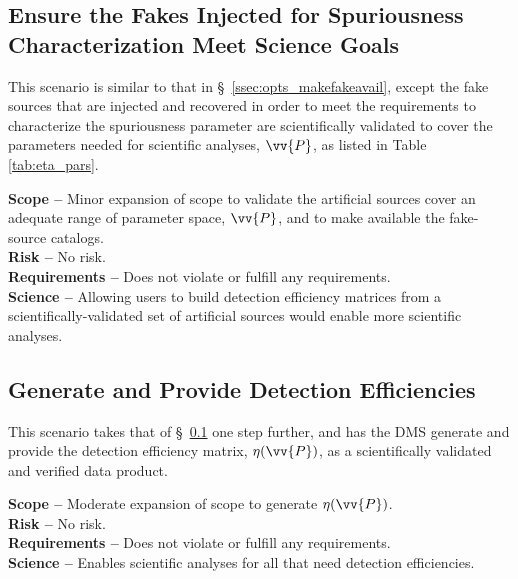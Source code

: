 \documentclass[DM,lsstdraft,toc]{lsstdoc}
\begin{document}
\subsection{Ensure the Fakes Injected for Spuriousness Characterization Meet Science Goals}\label{ssec:opts_ensurefakeP}

This scenario is similar to that in \S~\ref{ssec:opts_makefakeavail}, except the fake sources that are injected and recovered in order to meet the requirements to characterize the spuriousness parameter are scientifically validated to cover the parameters needed for scientific analyses, $\vv{P}$, as listed in Table \ref{tab:eta_pars}.

{\bf Scope --} Minor expansion of scope to validate the artificial sources cover an adequate range of parameter space, $\vv{P}$, and to make available the fake-source catalogs. \\
{\bf Risk --} No risk. \\
{\bf Requirements --} Does not violate or fulfill any requirements. \\
{\bf Science --} Allowing users to build detection efficiency matrices from a scientifically-validated set of artificial sources would enable more scientific analyses.

\subsection{Generate and Provide Detection Efficiencies}\label{ssec:opts_deteffs}

This scenario takes that of \S~\ref{ssec:opts_ensurefakeP} one step further, and has the DMS generate and provide the detection efficiency matrix, $\eta(\vv{P})$, as a scientifically validated and verified data product.

{\bf Scope --} Moderate expansion of scope to generate $\eta(\vv{P})$. \\
{\bf Risk --} No risk. \\
{\bf Requirements --} Does not violate or fulfill any requirements. \\
{\bf Science --} Enables scientific analyses for all that need detection efficiencies.

\end{document}
